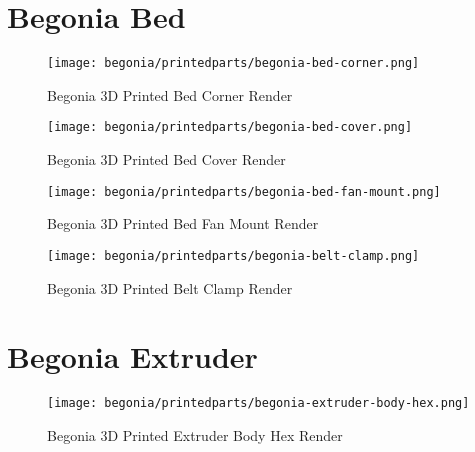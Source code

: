 % 

\section{Begonia Bed}

\begin{figure}[H]
\centering
\texttt{[image: begonia/printedparts/begonia-bed-corner.png]}
\caption{Begonia 3D Printed Bed Corner Render}
\label{fig:begbedcornerrender}
\end{figure}

\begin{figure}[H]
\centering
\texttt{[image: begonia/printedparts/begonia-bed-cover.png]}
\caption{Begonia 3D Printed Bed Cover Render}
\label{fig:begbedcoverrender}
\end{figure}

\begin{figure}[H]
\centering
\texttt{[image: begonia/printedparts/begonia-bed-fan-mount.png]}
\caption{Begonia 3D Printed Bed Fan Mount Render}
\label{fig:begbedfanmountrender}
\end{figure}

\begin{figure}[H]
\centering
\texttt{[image: begonia/printedparts/begonia-belt-clamp.png]}
\caption{Begonia 3D Printed Belt Clamp Render}
\label{fig:begbeltclamp}
\end{figure}



\section{Begonia Extruder}

\begin{figure}[H]
\centering
\texttt{[image: begonia/printedparts/begonia-extruder-body-hex.png]}
\caption{Begonia 3D Printed Extruder Body Hex Render}
\label{fig:begextruderbodyhex}
\end{figure}

